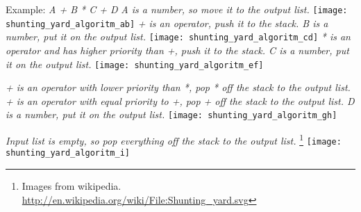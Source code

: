 \documentclass[12pt,a4paper]{article}
\begin{document}
\begin{itemize}
{}
\newpage
\textnormal{Example: \textit{ A + B * C + D}
\newline
\textit{A is a number, so move it to the output list. }
\newline
}
\texttt{[image: shunting\_yard\_algoritm\_ab]}
\textnormal{
\newline
\textit{+ is an operator, push it to the stack. \newline
B is a number, put it on the output list.}
\newline
}
\texttt{[image: shunting\_yard\_algoritm\_cd]}
\textnormal{
\newline
\textit{* is an operator and has higher priority than +, push it to the stack. \newline
C is a number, put it on the output list.}
\newline
}
\texttt{[image: shunting\_yard\_algoritm\_ef]}

\textnormal{
\newline
\textit{+ is an operator with lower priority than *, pop * off the stack to the output list. \newline
+ is an operator with equal priority to +, pop + off the stack to the output list. \newline
D is a number, put it on the output list.}
\newline
}
\texttt{[image: shunting\_yard\_algoritm\_gh]}

\textnormal{
\newline
\textit{Input list is empty, so pop everything off the stack to the output list.} \newline
\footnote{Images from wikipedia. \url{http://en.wikipedia.org/wiki/File:Shunting_yard.svg}}
}
\texttt{[image: shunting\_yard\_algoritm\_i]}







\end{itemize}
\end{document}
